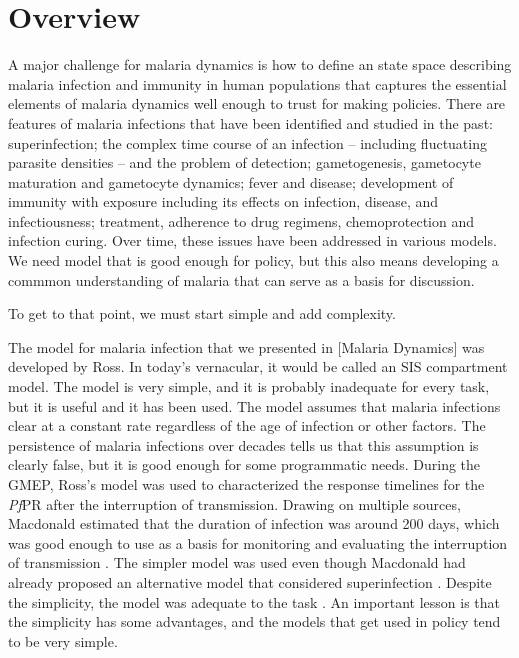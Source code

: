 \documentclass[
]{book}
\begin{document}
\section{Overview}\label{overview}

A major challenge for malaria dynamics is how to define an state space describing malaria infection and immunity in human populations that captures the essential elements of malaria dynamics well enough to trust for making policies.
There are features of malaria infections that have been identified and studied in the past: superinfection; the complex time course of an infection -- including fluctuating parasite densities -- and the problem of detection; gametogenesis, gametocyte maturation and gametocyte dynamics; fever and disease; development of immunity with exposure including its effects on infection, disease, and infectiousness; treatment, adherence to drug regimens, chemoprotection and infection curing. Over time, these issues have been addressed in various models.
We need model that is good enough for policy, but this also means developing a commmon understanding of malaria that can serve as a basis for discussion.

To get to that point, we must start simple and add complexity.

The model for malaria infection that we presented in {[}Malaria Dynamics{]} was developed by Ross. In today's vernacular, it would be called an SIS compartment model. The model is very simple, and it is probably inadequate for every task, but it is useful and it has been used. The model assumes that malaria infections clear at a constant rate regardless of the age of infection or other factors. The persistence of malaria infections over decades tells us that this assumption is clearly false, but it is good enough for some programmatic needs. During the GMEP, Ross's model was used to characterized the response timelines for the \emph{Pf}PR after the interruption of transmission. Drawing on multiple sources, Macdonald estimated that the duration of infection was around 200 days, which was good enough to use as a basis for monitoring and evaluating the interruption of transmission \autocite{MacdonaldG1964MalariaParasite}. The simpler model was used even though Macdonald had already proposed an alternative model that considered superinfection \autocite{MacdonaldG1950Superinfection}. Despite the simplicity, the model was adequate to the task \autocite{SmithDL2009EndemicityResponse}. An important lesson is that the simplicity has some advantages, and the models that get used in policy tend to be very simple.
\end{document}
